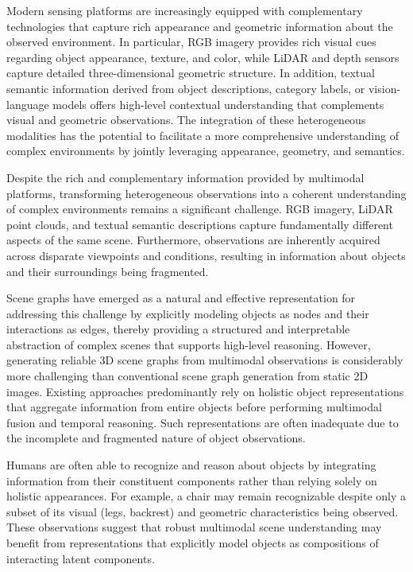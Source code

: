 \documentclass[letterpaper]{article}
\begin{document}
Modern sensing platforms are increasingly equipped with complementary technologies that capture rich appearance and geometric information about the observed environment. In particular, RGB imagery provides rich visual cues regarding object appearance, texture, and color, while LiDAR and depth sensors capture detailed three-dimensional geometric structure. In addition, textual semantic information derived from object descriptions, category labels, or vision-language models offers high-level contextual understanding that complements visual and geometric observations. The integration of these heterogeneous modalities has the potential to facilitate a more comprehensive understanding of complex environments by jointly leveraging appearance, geometry, and semantics.

Despite the rich and complementary information provided by multimodal platforms, transforming heterogeneous observations into a coherent understanding of complex environments remains a significant challenge. RGB imagery, LiDAR point clouds, and textual semantic descriptions capture fundamentally different aspects of the same scene. Furthermore, observations are inherently acquired across disparate viewpoints and conditions, resulting in information about objects and their surroundings being fragmented. 

Scene graphs have emerged as a natural and effective representation for addressing this challenge by explicitly modeling objects as nodes and their interactions as edges, thereby providing a structured and interpretable abstraction of complex scenes that supports high-level reasoning. However, generating reliable 3D scene graphs from multimodal observations is considerably more challenging than conventional scene graph generation from static 2D images. Existing approaches predominantly rely on holistic object representations that aggregate information from entire objects before performing multimodal fusion and temporal reasoning. Such representations are often inadequate due to the incomplete and fragmented nature of object observations. 

Humans are often able to recognize and reason about objects by integrating information from their constituent components rather than relying solely on holistic appearances. For example, a chair may remain recognizable despite only a subset of its visual (legs, backrest) and geometric characteristics being observed. These observations suggest that robust multimodal scene understanding may benefit from representations that explicitly model objects as compositions of interacting latent components. 
\end{document}
